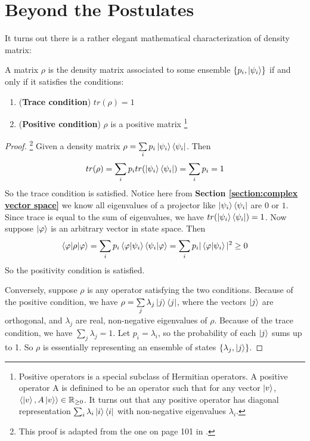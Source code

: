\section{Beyond the Postulates}
It turns out there is a rather elegant mathematical characterization of density matrix:

\begin{theorem}\label{thm: char of density matrix}
A matrix $\rho$ is the density matrix associated to some ensemble $\{p_i, \ket{\psi_i}\}$ if and only if it satisfies the conditions:
\begin{enumerate}
    \item (\textbf{Trace condition}) $tr(\rho)=1$
    \item (\textbf{Positive condition}) $\rho$ is a positive matrix \footnote{Positive operators is a special subclass of Hermitian operators. A positive operator A is definined to be an operator such that for any vector $\ket{v}$, $\langle \ket{v}, A\ket{v} \rangle \in \mathbb{R}_{\ge 0}$. It turns out that any positive operator has diagonal representation $\sum_i \lambda_i \ket{i}\bra{i}$ with non-negative eigenvalues $\lambda_i$.} 
\end{enumerate}
\end{theorem}

\begin{proof}\footnote{This proof is adapted from the one on page 101 in \cite{Nielsen}.}
Given a density matrix $\rho=\sum\limits_i p_i \ket{\psi_i}\bra{\psi_i}$. Then
\begin{equation}
    tr(\rho)=\sum_i p_i tr(\ket{\psi_i}\bra{\psi_i})=\sum_i p_i =1
\end{equation}
So the trace condition is satisfied. Notice here from \textbf{Section \ref{section:complex vector space}} we know all eigenvalues of a projector like $\ket{\psi_i}\bra{\psi_i}$ are $0$ or $1$. Since trace is equal to the sum of eigenvalues, we have $tr(\ket{\psi_i}\bra{\psi_i})=1$. Now suppose $\ket{\varphi}$ is an arbitrary vector in state space. Then
\begin{equation}
    \braket{\varphi|\rho|\varphi}=\sum_i p_i \braket{\varphi|\psi_i} \braket{\psi_i|\varphi}=\sum_i p_i |\braket{\varphi|\psi_i}|^2 \ge 0
\end{equation}
So the positivity condition is satisfied.

Conversely, suppose $\rho$ is any operator satisfying the two conditions. Because of the positive condition, we have $\rho=\sum\limits_j \lambda_j \ket{j}\bra{j}$, where the vectors $\ket{j}$ are orthogonal, and $\lambda_j$ are real, non-negative eigenvalues of $\rho$. Because of the trace condition, we have $\sum\limits_j \lambda_j=1$. Let $p_i=\lambda_i$, so the probability of each $\ket{j}$ sums up to 1. So $\rho$ is essentially representing an ensemble of states $\{\lambda_j, \ket{j}\}$.
\end{proof}

